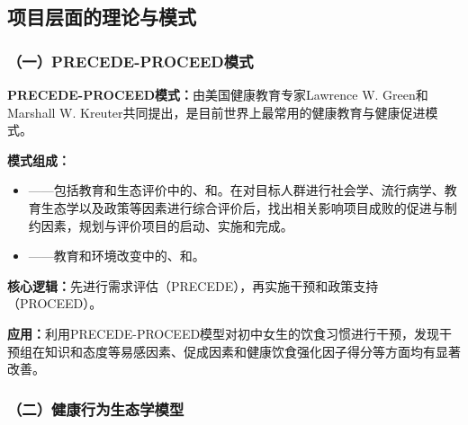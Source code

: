 \subsection{项目层面的理论与模式}

\subsubsection{（一）PRECEDE-PROCEED模式}

\begin{keybox}
\textbf{PRECEDE-PROCEED模式：}由美国健康教育专家Lawrence W. Green和Marshall W. Kreuter共同提出，是目前世界上最常用的健康教育与健康促进模式。

\textbf{模式组成：}
\begin{itemize}[leftmargin=*]
    \item {}——包括教育和生态评价中的、和。在对目标人群进行社会学、流行病学、教育生态学以及政策等因素进行综合评价后，找出相关影响项目成败的促进与制约因素，规划与评价项目的启动、实施和完成。
    \item {}——教育和环境改变中的、和。
\end{itemize}

\textbf{核心逻辑：}先进行需求评估（PRECEDE），再实施干预和政策支持（PROCEED）。

\textbf{应用：}利用PRECEDE-PROCEED模型对初中女生的饮食习惯进行干预，发现干预组在知识和态度等易感因素、促成因素和健康饮食强化因子得分等方面均有显著改善。
\end{keybox}

\subsubsection{（二）健康行为生态学模型}

